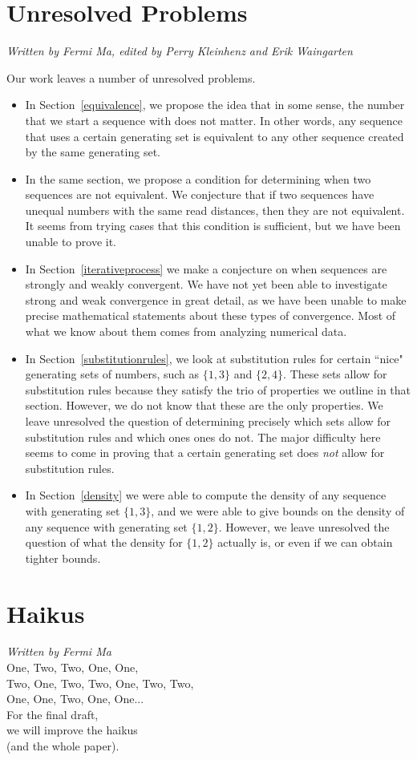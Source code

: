 \documentclass[runningheads,a4paper]{llncs}
\begin{document}
\section{Unresolved Problems}
\emph{Written by Fermi Ma, edited by Perry Kleinhenz and Erik Waingarten}

Our work leaves a number of unresolved problems. 

\begin{itemize}
\item In Section~\ref{equivalence}, we propose the idea that in some sense, the number that we start a sequence with does not matter. In other words, any sequence that uses a certain generating set is equivalent to any other sequence created by the same generating set.
\item In the same section, we propose a condition for determining when two sequences are not equivalent. We conjecture that if two sequences have unequal numbers with the same read distances, then they are not equivalent. It seems from trying cases that this condition is sufficient, but we have been unable to prove it.
\item In Section~\ref{iterativeprocess} we make a conjecture on when sequences are strongly and weakly convergent. We have not yet been able to investigate strong and weak convergence in great detail, as we have been unable to make precise mathematical statements about these types of convergence. Most of what we know about them comes from analyzing numerical data.
\item In Section~\ref{substitutionrules}, we look at substitution rules for certain ``nice" generating sets of numbers, such as $\{1,3\}$ and $\{2,4\}$. These sets allow for substitution rules because they satisfy the trio of properties we outline in that section. However, we do not know that these are the only properties. We leave unresolved the question of determining precisely which sets allow for substitution rules and which ones ones do not. The major difficulty here seems to come in proving that a certain generating set does \emph{not} allow for substitution rules.
\item In Section~\ref{density} we were able to compute the density of any sequence with generating set $\{1,3\}$, and we were able to give bounds on the density of any sequence with generating set $\{1,2\}$. However, we leave unresolved the question of what the density for $\{1,2\}$ actually is, or even if we can obtain tighter bounds.
\end{itemize}

\section{Haikus}
\emph{Written by Fermi Ma}\\

\noindent One, Two, Two, One, One,\\
Two, One, Two, Two, One, Two, Two,\\
One, One, Two, One, One...\\

\noindent For the final draft,\\
we will improve the haikus\\
(and the whole paper).
\end{document}
